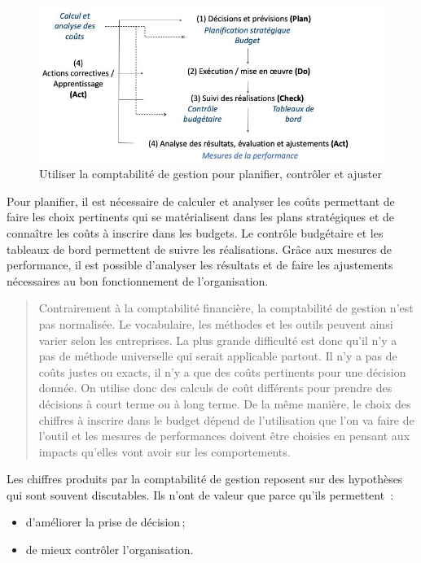 \documentclass{kaobook}
\begin{document}
\begin{figure}[htbp]
\centering
\includegraphics[width=.9\linewidth]{./img/pdca.jpeg}
\caption{\label{fig:orgf41eab6}Utiliser la comptabilité de gestion pour planifier, contrôler et ajuster}
\end{figure}

Pour planifier, il est nécessaire de calculer et analyser les coûts permettant de faire les choix pertinents qui se matérialisent dans les plans stratégiques et de connaître les coûts à inscrire dans les budgets. Le contrôle budgétaire et les tableaux de bord permettent de suivre les réalisations. Grâce aux mesures de performance, il est possible d'analyser les résultats et de faire les ajustements nécessaires au bon fonctionnement de l'organisation.\\

\begin{quote}
Contrairement à la comptabilité financière, la comptabilité de gestion n'est pas normalisée. Le vocabulaire, les méthodes et les outils peuvent ainsi varier selon les entreprises. La plus grande difficulté est donc qu'il n'y a pas de méthode universelle qui serait applicable partout. Il n'y a pas de coûts justes ou exacts, il n'y a que des coûts pertinents pour une décision donnée. On utilise donc des calculs de coût différents pour prendre des décisions à court terme ou à long terme. De la même manière, le choix des chiffres à inscrire dans le budget dépend de l'utilisation que l'on va faire de l'outil et les mesures de performances doivent être choisies en pensant aux impacts qu'elles vont avoir sur les comportements.\\
\end{quote}

Les chiffres produits par la comptabilité de gestion reposent sur des hypothèses qui sont souvent discutables. Ils n'ont de valeur que parce qu'ils permettent :\\
\begin{itemize}
\item d'améliorer la prise de décision ;\\
\item de mieux contrôler l'organisation.\\
\end{itemize}
\end{document}

